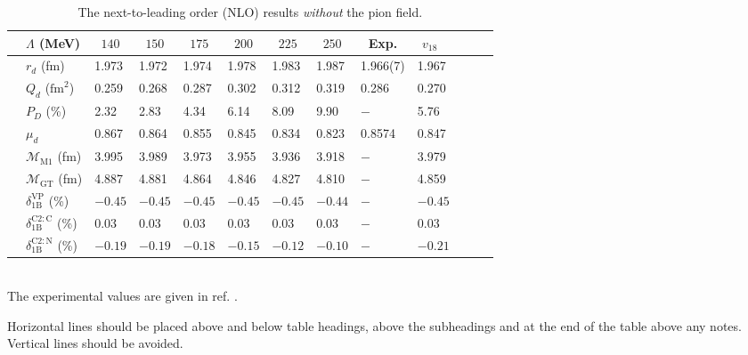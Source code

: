 \documentclass[fleqn,twoside]{article}
\begin{document}
\begin{sidewaystable}
\caption{The next-to-leading order (NLO) results
{\em without} the pion field.}
\label{table:2}
\newcommand{\m}{\hphantom{$-$}}
\newcommand{\cc}[1]{\multicolumn{1}{c}{#1}}
\renewcommand{\arraystretch}{1.2} %
\begin{tabular*}{\textheight}{@{\extracolsep{\fill}}lllllllllllll}
\hline
& $\Lambda$ (MeV) & \cc{$140$} & \cc{$150$} & \cc{$175$} & \cc{$200$} & \cc{$225$} & \cc{$250$} &
\cc{Exp.} & \cc{$v_{18}$~\cite{v18}} &  \\
\hline
 & $r_d$ (fm)                        & \m1.973 & \m1.972 & \m1.974 & \m1.978 & \m1.983 & \m1.987 & 1.966(7) & \m1.967 & \\[2pt]
 & $Q_d$ ($\mbox{fm}^2$)             & \m0.259 & \m0.268 & \m0.287 & \m0.302 & \m0.312 & \m0.319 & 0.286    & \m0.270 & \\[2pt]
 & $P_D$ (\%)                        & \m2.32  & \m2.83  & \m4.34  & \m6.14  & \m8.09  & \m9.90  & $-$      & \m5.76  & \\[2pt]
 & $\mu_d$                           & \m0.867 & \m0.864 & \m0.855 & \m0.845 & \m0.834 & \m0.823 & 0.8574   & \m0.847 & \\[5pt]
 & $\mathcal{M}_{\mathrm{M1}}$ (fm)             & \m3.995 & \m3.989 & \m3.973 & \m3.955 & \m3.936 & \m3.918 & $-$      & \m3.979 & \\[5pt]
 & $\mathcal{M}_{\mathrm{GT}}$ (fm)             & \m4.887 & \m4.881 & \m4.864 & \m4.846 & \m4.827 & \m4.810 & $-$      & \m4.859 & \\[2pt]
 & $\delta_{\mathrm{1B}}^{\mathrm{VP}}$ (\%)   & $-0.45$ & $-0.45$ & $-0.45$ & $-0.45$ & $-0.45$ & $-0.44$ & $-$      & $-0.45$ & \\[2pt]
 & $\delta_{\mathrm{1B}}^{\mathrm{C2:C}}$ (\%) & \m0.03  & \m0.03  & \m0.03  & \m0.03  & \m0.03  & \m0.03  & $-$      & \m0.03  & \\[2pt]
 & $\delta_{\mathrm{1B}}^{\mathrm{C2:N}}$ (\%) & $-0.19$ & $-0.19$ & $-0.18$ & $-0.15$ & $-0.12$ & $-0.10$ & $-$      & $-0.21$ & \\
\hline
\end{tabular*}\\[2pt]
The experimental values are given in ref. \cite{Eato75}.
\end{sidewaystable}

Horizontal lines should be placed above and below table headings, above
the subheadings and at the end of the table above any notes. Vertical
lines should be avoided.
\end{document}
